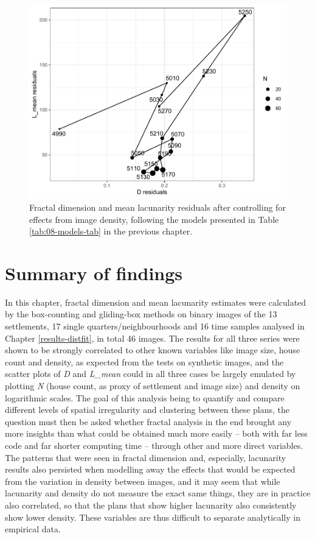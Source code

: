 \documentclass[
  12pt,
  a4paper, twoside]{book}
\begin{document}
\begin{figure}

{\centering \includegraphics[width=0.9\linewidth]{bookdown-demo_files/figure-latex/09-time-resid-1} 

}

\caption[D and L\_mean residuals, controlled for density, time samples]{Fractal dimension and mean lacunarity residuals after controlling for effects from image density, following the models presented in Table \ref{tab:08-models-tab} in the previous chapter.}\label{fig:09-time-resid}
\end{figure}

\hypertarget{summary-of-findings-1}{%
\section{Summary of findings}\label{summary-of-findings-1}}

In this chapter, fractal dimension and mean lacunarity estimates were calculated by the box-counting and gliding-box methods on binary images of the 13 settlements, 17 single quarters/neighbourhoods and 16 time samples analysed in Chapter \ref{results-distfit}, in total 46 images. The results for all three series were shown to be strongly correlated to other known variables like image size, house count and density, as expected from the tests on synthetic images, and the scatter plots of \emph{D} and \emph{L\_mean} could in all three cases be largely emulated by plotting \emph{N} (house count, as proxy of settlement and image size) and density on logarithmic scales. The goal of this analysis being to quantify and compare different levels of spatial irregularity and clustering between these plans, the question must then be asked whether fractal analysis in the end brought any more insights than what could be obtained much more easily -- both with far less code and far shorter computing time -- through other and more direct variables. The patterns that were seen in fractal dimension and, especially, lacunarity results also persisted when modelling away the effects that would be expected from the variation in density between images, and it may seem that while lacunarity and density do not measure the exact same things, they are in practice also correlated, so that the plans that show higher lacunarity also consistently show lower density. These variables are thus difficult to separate analytically in empirical data.
\end{document}
